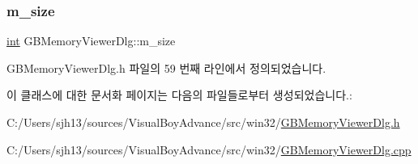 \mbox{\label{class_g_b_memory_viewer_dlg_a9837ff346b59fb46c6b778a0adf8adf8}} 
\subsubsection{\texorpdfstring{m\+\_\+size}{m\_size}}
{\footnotesize\ttfamily \mbox{\hyperlink{_util_8cpp_a0ef32aa8672df19503a49fab2d0c8071}{int}} G\+B\+Memory\+Viewer\+Dlg\+::m\+\_\+size}



G\+B\+Memory\+Viewer\+Dlg.\+h 파일의 59 번째 라인에서 정의되었습니다.



이 클래스에 대한 문서화 페이지는 다음의 파일들로부터 생성되었습니다.\+:\begin{DoxyCompactItemize}
\item 
C\+:/\+Users/sjh13/sources/\+Visual\+Boy\+Advance/src/win32/\mbox{\hyperlink{_g_b_memory_viewer_dlg_8h}{G\+B\+Memory\+Viewer\+Dlg.\+h}}\item 
C\+:/\+Users/sjh13/sources/\+Visual\+Boy\+Advance/src/win32/\mbox{\hyperlink{_g_b_memory_viewer_dlg_8cpp}{G\+B\+Memory\+Viewer\+Dlg.\+cpp}}\end{DoxyCompactItemize}
